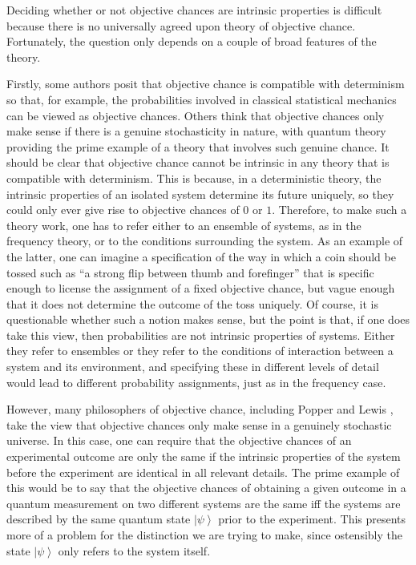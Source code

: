 \documentclass[DIV=calc,fontsize=12pt]{scrartcl} %
\theoremstyle{definition}
\theoremstyle{plain}
\newcommand{\Ket}[1]{\ensuremath{\left \vert #1 \right \rangle}}
\begin{document}
Deciding whether or not objective chances are intrinsic properties is
difficult because there is no universally agreed upon theory of
objective chance.  Fortunately, the question only depends on a couple
of broad features of the theory.

Firstly, some authors posit that objective chance is compatible with
determinism so that, for example, the probabilities involved in
classical statistical mechanics can be viewed as objective chances.
Others think that objective chances only make sense if there is a
genuine stochasticity in nature, with quantum theory providing the
prime example of a theory that involves such genuine chance.  It
should be clear that objective chance cannot be intrinsic in any
theory that is compatible with determinism.  This is because, in a
deterministic theory, the intrinsic properties of an isolated system
determine its future uniquely, so they could only ever give rise to
objective chances of $0$ or $1$.  Therefore, to make such a theory
work, one has to refer either to an ensemble of systems, as in the
frequency theory, or to the conditions surrounding the system.  As an
example of the latter, one can imagine a specification of the way in
which a coin should be tossed such as ``a strong flip between thumb
and forefinger'' that is specific enough to license the assignment of
a fixed objective chance, but vague enough that it does not determine
the outcome of the toss uniquely.  Of course, it is questionable
whether such a notion makes sense, but the point is that, if one does
take this view, then probabilities are not intrinsic properties of
systems.  Either they refer to ensembles or they refer to the
conditions of interaction between a system and its environment, and
specifying these in different levels of detail would lead to
different probability assignments, just as in the frequency case.

However, many philosophers of objective chance, including Popper
\cite{Popper2011} and Lewis \cite{Lewis2011}, take the view that
objective chances only make sense in a genuinely stochastic universe.
In this case, one can require that the objective chances of an
experimental outcome are only the same if the intrinsic properties of
the system before the experiment are identical in all relevant
details.  The prime example of this would be to say that the objective
chances of obtaining a given outcome in a quantum measurement on two
different systems are the same iff the systems are described by the
same quantum state $\Ket{\psi}$ prior to the experiment.  This
presents more of a problem for the distinction we are trying to make,
since ostensibly the state $\Ket{\psi}$ only refers to the system
itself.
\end{document}
